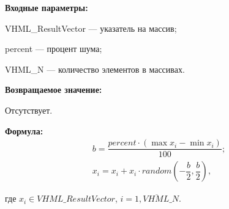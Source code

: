 \textbf{Входные параметры:}  

 VHML\_ResultVector --- указатель на массив;
 
 percent --- процент шума;
 
 VHML\_N --- количество элементов в массивах.

\textbf{Возвращаемое значение:}

Отсутствует.

\textbf{Формула:}
\begin{eqnarray*}
b=\dfrac{percent\cdot\left( \max{x_i}-\min{x_i}\right)}{100};\\
x_i=x_i+x_i\cdot random \left( -\dfrac{b}{2},\dfrac{b}{2}\right),
\end{eqnarray*}

где $x_i \in VHML\_ResultVector$, $i=\overline{1,VHML\_N}$.